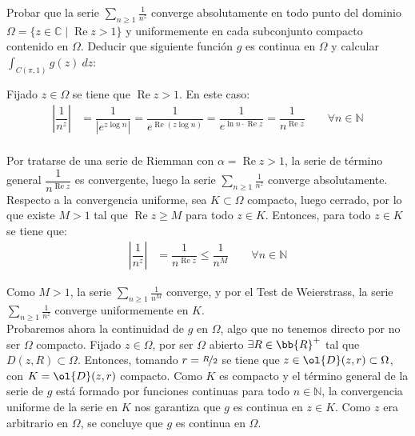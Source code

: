 \documentclass[12pt]{article}
\renewcommand{\Re}{\operatorname{Re}} %
\begin{document}
    \newpage
    \setcounter{ejercicio}{0}

    \begin{ejercicio}[4 puntos]
        Probar que la serie $\displaystyle \sum_{n\geq 1} \frac{1}{n^z}$ converge absolutamente en todo punto del dominio $\Omega = \{ z \in \mathbb{C} \mid \Re z > 1 \}$ y uniformemente en cada subconjunto compacto contenido en $\Omega$. Deducir que siguiente función $g$ es continua en $\Omega$ y calcular $\displaystyle \int_{C(\pi,1)} g(z) \ dz$:

        Fijado $z\in \Omega$ se tiene que $\Re z > 1$. En este caso:
        \begin{align*}
            \left|\dfrac{1}{n^z}\right| &= \dfrac{1}{|e^{z \log n}|} = \dfrac{1}{e^{\Re(z\log n)}} = \dfrac{1}{e^{\ln n\cdot \Re z}} = \dfrac{1}{n^{\Re z}}\qquad \forall n\in \mathbb{N}\\
        \end{align*}

        Por tratarse de una serie de Riemman con $\alpha = \Re z > 1$, la serie de término general $\dfrac{1}{n^{\Re z}}$ es convergente, luego la serie $\displaystyle \sum_{n\geq 1} \frac{1}{n^z}$ converge absolutamente.\\

        Respecto a la convergencia uniforme, sea $K\subset \Omega$ compacto, luego cerrado, por lo que existe $M>1$ tal que $\Re z \geq M$ para todo $z\in K$. Entonces, para todo $z\in K$ se tiene que:
        \begin{align*}
            \left|\dfrac{1}{n^z}\right| &= \dfrac{1}{n^{\Re z}} \leq \dfrac{1}{n^M} \qquad \forall n\in \mathbb{N}
        \end{align*}

        Como $M> 1$, la serie $\displaystyle \sum_{n\geq 1} \frac{1}{n^M}$ converge, y por el Test de Weierstrass, la serie $\displaystyle \sum_{n\geq 1} \frac{1}{n^z}$ converge uniformemente en $K$.\\
        
        Probaremos ahora la continuidad de $g$ en $\Omega$, algo que no tenemos directo por no ser $\Omega$ compacto. Fijado $z\in \Omega$, por ser $\Omega$ abierto $\exists R\in \bb{R}^+$ tal que $D(z,R)\subset \Omega$. Entonces, tomando $r=\nicefrac{R}{2}$ se tiene que $z\in \ol{D}(z,r)\subset \Omega$, con $K=\ol{D}(z,r)$ compacto. Como $K$ es compacto y el término general de la serie de $g$ está formado por funciones continuas para todo $n\in \mathbb{N}$, la convergencia uniforme de la serie en $K$ nos garantiza que $g$ es continua en $z\in K$. Como $z$ era arbitrario en $\Omega$, se concluye que $g$ es continua en $\Omega$.\\


\end{ejercicio}
\end{document}
